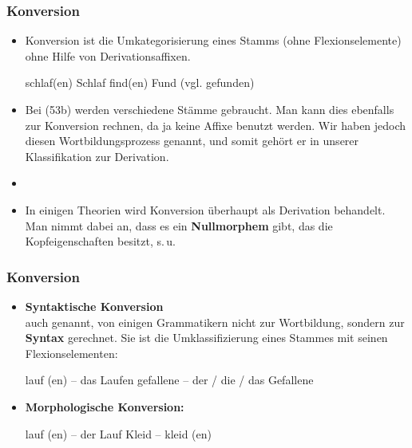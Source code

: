 \begin{frame}
\frametitle{Konversion}

\begin{itemize}
	\item Konversion ist die Umkategorisierung eines Stamms (ohne Flexionselemente) ohne Hilfe von Derivationsaffixen.
	
	\eal 
	\ex schlaf(en) \ras Schlaf
	\ex find(en) \ras Fund (vgl. gefunden)
	\zl
	
	\item Bei (53b) werden verschiedene Stämme gebraucht. Man kann dies ebenfalls zur Konversion rechnen, da ja keine Affixe benutzt werden. Wir haben jedoch diesen Wortbildungsprozess \textbf{} genannt, und somit gehört er in unserer Klassifikation zur Derivation.
	\item []
	\item In einigen Theorien wird Konversion überhaupt als Derivation behandelt. Man nimmt dabei an, dass es ein \textbf{Nullmorphem} gibt, das die Kopfeigenschaften besitzt, s.\,u.
	
\end{itemize}


\end{frame}




\begin{frame}
\frametitle{Konversion}

\begin{itemize}
	\item \textbf{Syntaktische Konversion}\\ auch  genannt, von einigen Grammatikern nicht zur Wortbildung, sondern zur \textbf{Syntax} gerechnet. Sie ist die Umklassifizierung eines Stammes mit seinen Flexionselementen:
	
	\eal 
	\ex lauf (en) -- das Laufen 
	\ex gefallene -- der / die / das Gefallene
	\zl
	
	\item \textbf{Morphologische Konversion:}
	
	\eal 
	\ex lauf (en) -- der Lauf
	\ex Kleid -- kleid (en)
	\zl
	
\end{itemize}

\end{frame}



